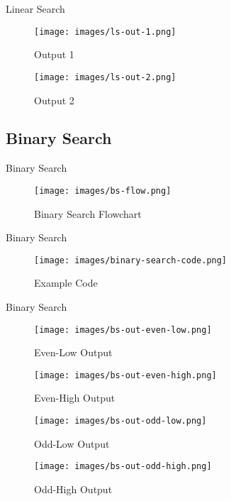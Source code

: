 \documentclass[aspectratio=169]{beamer}
\begin{document}
\begin{frame}{Linear Search}
    \begin{figure}
        \begin{minipage}{0.5\textwidth}
            \begin{center}
                \texttt{[image: images/ls-out-1.png]}
                \caption{Output 1}
            \end{center}
        \end{minipage}%
        \begin{minipage}{0.5\textwidth}
            \begin{center}
                \texttt{[image: images/ls-out-2.png]}
                \caption{Output 2}
            \end{center}
        \end{minipage}
    \end{figure}
\end{frame}

\subsection{Binary Search}

\begin{frame}{Binary Search} \pause
    \begin{figure}
        \begin{center}
            \texttt{[image: images/bs-flow.png]}
            \caption{Binary Search Flowchart}
        \end{center}
    \end{figure}
\end{frame}

\begin{frame}{Binary Search}
    \begin{figure}
        \centering
        \texttt{[image: images/binary-search-code.png]}
        \caption{Example Code}
    \end{figure}
\end{frame}

\begin{frame}{Binary Search}
    \begin{figure}
        \begin{minipage}{0.5\textwidth}
            \centering
            \texttt{[image: images/bs-out-even-low.png]}
            \caption{Even-Low Output}
            \texttt{[image: images/bs-out-even-high.png]}
            \caption{Even-High Output}
        \end{minipage}%
        \begin{minipage}{0.5\textwidth}
            \centering
            \texttt{[image: images/bs-out-odd-low.png]}
            \caption{Odd-Low Output}
            \texttt{[image: images/bs-out-odd-high.png]}
            \caption{Odd-High Output}
        \end{minipage}
    \end{figure}
\end{frame}
\end{document}
